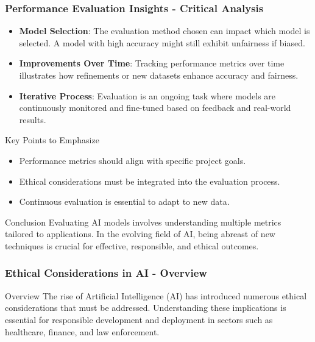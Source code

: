 \documentclass[aspectratio=169]{beamer}
\begin{document}
\begin{frame}[fragile]
    \frametitle{Performance Evaluation Insights - Critical Analysis}
    \begin{itemize}
        \item \textbf{Model Selection}: The evaluation method chosen can impact which model is selected. A model with high accuracy might still exhibit unfairness if biased.
        
        \item \textbf{Improvements Over Time}: Tracking performance metrics over time illustrates how refinements or new datasets enhance accuracy and fairness.
        
        \item \textbf{Iterative Process}: Evaluation is an ongoing task where models are continuously monitored and fine-tuned based on feedback and real-world results.
    \end{itemize}

    \begin{block}{Key Points to Emphasize}
        \begin{itemize}
            \item Performance metrics should align with specific project goals.
            \item Ethical considerations must be integrated into the evaluation process.
            \item Continuous evaluation is essential to adapt to new data.
        \end{itemize}
    \end{block}
    
    \begin{block}{Conclusion}
        Evaluating AI models involves understanding multiple metrics tailored to applications. In the evolving field of AI, being abreast of new techniques is crucial for effective, responsible, and ethical outcomes.
    \end{block}
\end{frame}

\begin{frame}[fragile]
    \frametitle{Ethical Considerations in AI - Overview}
    \begin{block}{Overview}
        The rise of Artificial Intelligence (AI) has introduced numerous ethical considerations that must be addressed. Understanding these implications is essential for responsible development and deployment in sectors such as healthcare, finance, and law enforcement.
    \end{block}
\end{frame}
\end{document}
